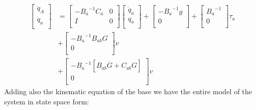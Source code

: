 \begin{equation}
\begin{split}
	\left[\begin{matrix}\ddot{q}_A\\\dot{q}_a\\\end{matrix}\right]&=\left[\begin{matrix}-{B_a}^{-1}C_a&0\\I&0\\\end{matrix}\right]\left[\begin{matrix}\dot{q}_a\\q_a\\\end{matrix}\right]+\left[\begin{matrix}{{-B}_a}^{-1}g\\0\\\end{matrix}\right]+\left[\begin{matrix}{B_a}^{-1}\\0\\\end{matrix}\right]\tau_a\\&+\left[\begin{matrix}-{B_a}^{-1}B_{ab}G\\0\\\end{matrix}\right]\dot{v}\\&+\left[\begin{matrix}-{B_a}^{-1}\left[B_{ab}\dot{G}+C_{ab}G\right]\\0\\\end{matrix}\right]v
\end{split}
\end{equation}
Adding also the kinematic equation of the base we have the entire model of the system in state space form:
